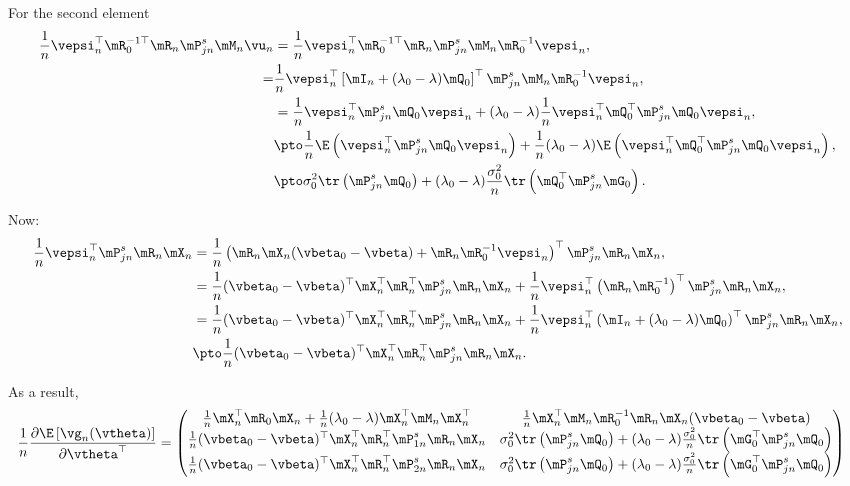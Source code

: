 \begin{subappendices}
For the second element
\begin{equation*}
\begin{aligned}
  \frac{1}{n}\vepsi_n^\top\mR_0^{-1\top}\mR_n\mP_{jn}^s\mM_n\vu_n & = \frac{1}{n}\vepsi_n^\top\mR_0^{-1\top}\mR_n\mP_{jn}^s\mM_n\mR_0^{-1}\vepsi_n,  \\
  = & \frac{1}{n}\vepsi_n^\top\left[\mI_n + (\lambda_0-\lambda)\mQ_0\right]^\top\mP_{jn}^s\mM_n\mR_0^{-1}\vepsi_n, \\
  & = \frac{1}{n}\vepsi_n^\top\mP_{jn}^s\mQ_0\vepsi_n + (\lambda_0 - \lambda)\frac{1}{n}\vepsi_n^\top\mQ_0^\top\mP_{jn}^s\mQ_0\vepsi_n, \\
  & \pto \frac{1}{n}\E\left(\vepsi_n^\top\mP_{jn}^s\mQ_0\vepsi_n\right)  + \frac{1}{n} (\lambda_0 - \lambda) \E\left(\vepsi_n^\top\mQ_0^\top\mP_{jn}^s\mQ_0\vepsi_n \right),\\
  & \pto \sigma_0^2 \tr\left(\mP_{jn}^{s}\mQ_0\right) + (\lambda_0- \lambda)\frac{\sigma_0^2}{n}\tr\left(\mQ_0^\top\mP_{jn}^s\mG_0\right).
\end{aligned}
\end{equation*}

Now:
\begin{equation*}
\begin{aligned}
\frac{1}{n}\vepsi_n^\top\mP_{jn}^s\mR_n\mX_n & = \frac{1}{n}\left(\mR_n\mX_n(\vbeta_0 - \vbeta) + \mR_n\mR_0^{-1}\vepsi_n\right)^\top\mP_{jn}^s\mR_n\mX_n, \\
& = \frac{1}{n}(\vbeta_0 - \vbeta)^\top\mX_n^\top\mR_n^\top\mP_{jn}^s\mR_n\mX_n + \frac{1}{n}\vepsi_n^\top\left(\mR_n\mR_0^{-1}\right)^\top\mP_{jn}^s\mR_n\mX_n, \\
& = \frac{1}{n}(\vbeta_0 - \vbeta)^\top\mX_n^\top\mR_n^\top\mP_{jn}^s\mR_n\mX_n + \frac{1}{n}\vepsi_n^\top\left(\mI_n + (\lambda_0 - \lambda)\mQ_0\right)^\top\mP_{jn}^s\mR_n\mX_n, \\
& \pto \frac{1}{n}(\vbeta_0 - \vbeta)^\top\mX_n^\top\mR_n^\top\mP_{jn}^s\mR_n\mX_n.
\end{aligned}
\end{equation*}


As a result, 
\begin{equation}
\begin{aligned}
\frac{1}{n}\frac{\partial \E\left[\vg_n(\vtheta)\right]}{\partial \vtheta^\top} & = \begin{pmatrix}
  \frac{1}{n}\mX_n^\top\mR_0\mX_n +\frac{1}{n}(\lambda_0 - \lambda)\mX^\top_n\mM_n\mX_n^\top & \frac{1}{n}\mX_n^\top\mM_n\mR_0^{-1}\mR_n\mX_n(\vbeta_0 - \vbeta) \\
  \frac{1}{n}(\vbeta_0 - \vbeta)^\top\mX_n^\top\mR_n^\top\mP_{1n}^s\mR_n\mX_n & \sigma_0^2 \tr\left(\mP_{jn}^{s}\mQ_0\right) + (\lambda_0- \lambda)\frac{\sigma_0^2}{n}\tr\left(\mG_0^\top\mP_{jn}^s\mQ_0\right) \\
  \frac{1}{n}(\vbeta_0 - \vbeta)^\top\mX_n^\top\mR_n^\top\mP_{2n}^s\mR_n\mX_n & \sigma_0^2 \tr\left(\mP_{jn}^{s}\mQ_0\right) + (\lambda_0- \lambda)\frac{\sigma_0^2}{n}\tr\left(\mG_0^\top\mP_{jn}^s\mQ_0\right)
\end{pmatrix}
\end{aligned}
\end{equation}


\end{subappendices}
